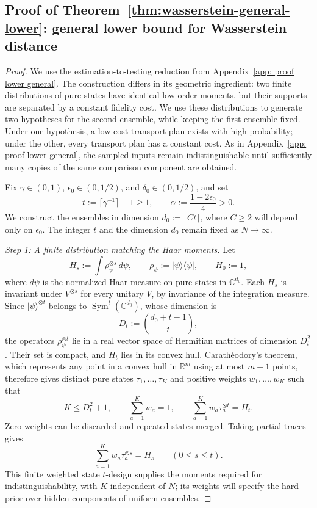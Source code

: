 \documentclass[aps,prx,reprint,superscriptaddress,amsmath,amssymb,longbibliography,floatfix]{revtex4-2}
\theoremstyle{plain}
\theoremstyle{definition}
\theoremstyle{remark}
\begin{document}
\subsection{Proof of Theorem~\ref{thm:wasserstein-general-lower}: general lower bound for Wasserstein distance}
\label{app:wasserstein-general-lower}
\begin{proof}
We use the estimation-to-testing reduction from Appendix~\ref{app: proof lower general}. The construction differs in its geometric ingredient: two finite distributions of pure states have identical low-order moments, but their supports are separated by a constant fidelity cost. We use these distributions to generate two hypotheses for the second ensemble, while keeping the first ensemble fixed. Under one hypothesis, a low-cost transport plan exists with high probability; under the other, every transport plan has a constant cost. As in Appendix~\ref{app: proof lower general}, the sampled inputs remain indistinguishable until sufficiently many copies of the same comparison component are obtained.

Fix $\gamma\in(0,1)$, $\epsilon_0\in(0,1/2)$, and $\delta_0\in(0,1/2)$, and set
\begin{equation}
t:=\lceil\gamma^{-1}\rceil-1\ge1,\qquad \alpha:=\frac{1-2\epsilon_0}{4}>0.
\label{eq:app-wasserstein-design-parameters}
\end{equation}
We construct the ensembles in dimension $d_0:=\lceil Ct\rceil$, where $C\ge2$ will depend only on $\epsilon_0$. The integer $t$ and the dimension $d_0$ remain fixed as $N\to\infty$.

\emph{Step 1: A finite distribution matching the Haar moments.} Let
\[
H_s:=\int \rho_\psi^{\otimes s}\,d\psi,\qquad \rho_\psi:=|\psi\rangle\langle\psi|,\qquad H_0:=1,
\]
where $d\psi$ is the normalized Haar measure on pure states in $\mathbb C^{d_0}$. Each $H_s$ is invariant under $V^{\otimes s}$ for every unitary $V$, by invariance of the integration measure. Since $|\psi\rangle^{\otimes t}$ belongs to $\operatorname{Sym}^t(\mathbb C^{d_0})$, whose dimension is
\[
D_t:=\binom{d_0+t-1}{t},
\]
the operators $\rho_\psi^{\otimes t}$ lie in a real vector space of Hermitian matrices of dimension $D_t^2$. Their set is compact, and $H_t$ lies in its convex hull. Carath\'eodory's theorem, which represents any point in a convex hull in $\mathbb R^m$ using at most $m+1$ points, therefore gives distinct pure states $\tau_1,\ldots,\tau_K$ and positive weights $w_1,\ldots,w_K$ such that
\begin{equation}
K\le D_t^2+1,\qquad \sum_{a=1}^Kw_a=1,\qquad \sum_{a=1}^Kw_a\tau_a^{\otimes t}=H_t.
\label{eq:app-wasserstein-finite-design}
\end{equation}
Zero weights can be discarded and repeated states merged. Taking partial traces gives
\begin{equation}
\sum_{a=1}^Kw_a\tau_a^{\otimes s}=H_s\qquad(0\le s\le t).
\label{eq:app-wasserstein-design-moments}
\end{equation}
This finite weighted state $t$-design supplies the moments required for indistinguishability, with $K$ independent of $N$; its weights will specify the hard prior over hidden components of uniform ensembles.


\end{proof}
\end{document}
